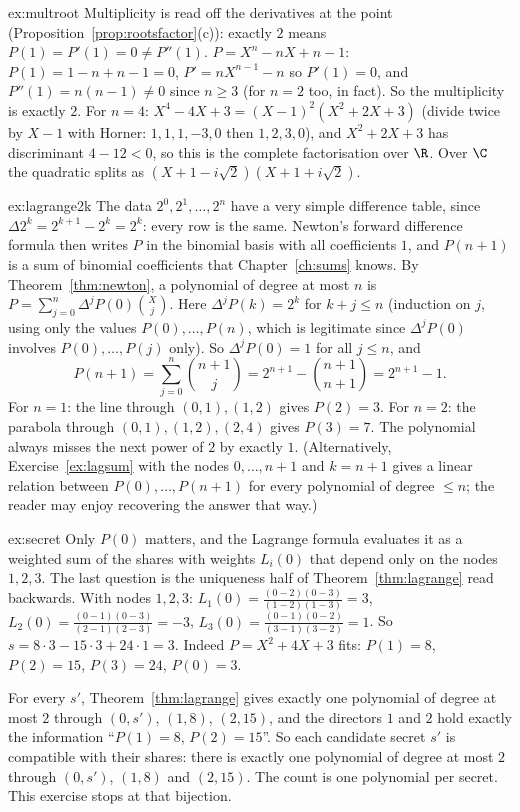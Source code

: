 \begin{solution}{ex:multroot}
\idea Multiplicity is read off the derivatives at the point (Proposition~\ref{prop:rootsfactor}(c)): exactly $2$ means $P(1)=P'(1)=0\ne P''(1)$.
\writeup $P=X^n-nX+n-1$: $P(1)=1-n+n-1=0$, $P'=nX^{n-1}-n$ so $P'(1)=0$, and $P''(1)=n(n-1)\ne0$ since $n\ge3$ (for $n=2$ too, in fact). So the multiplicity is exactly $2$.
For $n=4$: $X^4-4X+3=(X-1)^2(X^2+2X+3)$ (divide twice by $X-1$ with Horner: $1,1,1,-3,0$ then $1,2,3,0$), and $X^2+2X+3$ has discriminant $4-12<0$, so this is the complete factorisation over $\R$. Over $\C$ the quadratic splits as $(X+1-i\sqrt2)(X+1+i\sqrt2)$.
\end{solution}

\begin{solution}{ex:lagrange2k}
\idea The data $2^0,2^1,\dots,2^n$ have a very simple difference table, since $\Delta2^k=2^{k+1}-2^k=2^k$: every row is the same. Newton's forward difference formula then writes $P$ in the binomial basis with all coefficients $1$, and $P(n+1)$ is a sum of binomial coefficients that Chapter~\ref{ch:sums} knows.
\writeup By Theorem~\ref{thm:newton}, a polynomial of degree at most $n$ is $P=\sum_{j=0}^n\Delta^jP(0)\binom Xj$. Here $\Delta^jP(k)=2^k$ for $k+j\le n$ (induction on $j$, using only the values $P(0),\dots,P(n)$, which is legitimate since $\Delta^jP(0)$ involves $P(0),\dots,P(j)$ only). So $\Delta^jP(0)=1$ for all $j\le n$, and
\[
P(n+1)=\sum_{j=0}^n\binom{n+1}j=2^{n+1}-\binom{n+1}{n+1}=2^{n+1}-1.
\]
For $n=1$: the line through $(0,1),(1,2)$ gives $P(2)=3$. For $n=2$: the parabola through $(0,1),(1,2),(2,4)$ gives $P(3)=7$. The polynomial always misses the next power of $2$ by exactly $1$. (Alternatively, Exercise~\ref{ex:lagsum} with the nodes $0,\dots,n+1$ and $k=n+1$ gives a linear relation between $P(0),\dots,P(n+1)$ for every polynomial of degree $\le n$; the reader may enjoy recovering the answer that way.)
\end{solution}

\begin{solution}{ex:secret}
\idea Only $P(0)$ matters, and the Lagrange formula evaluates it as a weighted sum of the shares with weights $L_i(0)$ that depend only on the nodes $1,2,3$. The last question is the uniqueness half of Theorem~\ref{thm:lagrange} read backwards.
\writeup With nodes $1,2,3$:
$L_1(0)=\frac{(0-2)(0-3)}{(1-2)(1-3)}=3$, $L_2(0)=\frac{(0-1)(0-3)}{(2-1)(2-3)}=-3$, $L_3(0)=\frac{(0-1)(0-2)}{(3-1)(3-2)}=1$. So
$s=8\cdot3-15\cdot3+24\cdot1=3$. Indeed $P=X^2+4X+3$ fits: $P(1)=8$, $P(2)=15$, $P(3)=24$, $P(0)=3$.

For every $s'$, Theorem~\ref{thm:lagrange} gives exactly one polynomial of degree at most $2$ through $(0,s')$, $(1,8)$, $(2,15)$, and the
directors $1$ and $2$ hold exactly the information ``$P(1)=8$, $P(2)=15$''. So each candidate secret $s'$ is compatible with their shares: there is exactly one polynomial of degree at most $2$ through $(0,s')$, $(1,8)$ and $(2,15)$. The count is one polynomial per secret. This exercise stops at that bijection.
\end{solution}

